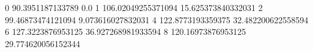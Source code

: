 0 90.3951187133789 0.0
1 106.02049255371094 15.625373840332031
2 99.46873474121094 9.073616027832031
4 122.8773193359375 32.482200622558594
6 127.3223876953125 36.927268981933594
8 120.16973876953125 29.774620056152344
